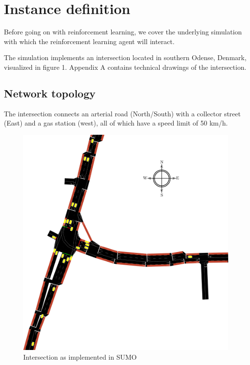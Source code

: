 \section{Instance definition}
Before going on with reinforcement learning, we cover the underlying simulation with which the reinforcement learning agent will interact.

The simulation implements an intersection located in southern Odense, Denmark, visualized in figure 1.
Appendix A contains technical drawings of the intersection.


\subsection{Network topology}

The intersection connects an arterial road (North/South) with a collector street (East) and a gas station (west), all of which have a speed limit of 50 km/h.

\begin{figure}[!htb]
  \centering
  \includegraphics[scale=0.2]{../include/PDF/intersection_with_compass.pdf}
  \caption{Intersection as implemented in SUMO}
  \label{fig:sumointerimpl}
\end{figure}

